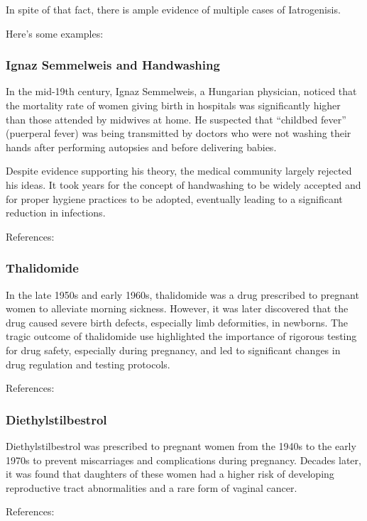 \documentclass{article}
\begin{document}
In spite of that fact, there is ample evidence of multiple cases of Iatrogenisis. \cite{VarleyVarma2021}

Here's some examples:

\subsubsection{Ignaz Semmelweis and Handwashing}

In the mid-19th century, Ignaz Semmelweis, a Hungarian physician, noticed that the mortality rate of women giving birth in hospitals was significantly higher than those attended by midwives at home. He suspected that  ``childbed fever'' (puerperal fever) was being transmitted by doctors who were not washing their hands after performing autopsies and before delivering babies.

Despite evidence supporting his theory, the medical community largely rejected his ideas. It took years for the concept of handwashing to be widely accepted and for proper hygiene practices to be adopted, eventually leading to a significant reduction in infections.

References: \cite{Semmelweis2006}

\subsubsection{Thalidomide}
In the late 1950s and early 1960s, thalidomide was a drug prescribed to pregnant women to alleviate morning sickness. However, it was later discovered that the drug caused severe birth defects, especially
limb deformities, in newborns. The tragic outcome of thalidomide use highlighted the importance of rigorous testing for drug safety, especially during pregnancy, and led to significant changes in drug
regulation and testing protocols.

References: \cite{WGMcbride}

\subsubsection{Diethylstilbestrol}
Diethylstilbestrol was prescribed to pregnant women from the 1940s to the early 1970s to prevent miscarriages and complications during pregnancy. Decades later, it was found that daughters of these women
had a higher risk of developing reproductive tract abnormalities and a rare form of vaginal cancer.

References: \cite{Diethylstilbestrol2000}
\end{document}
